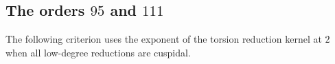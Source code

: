 \subsection{The orders $95$ and $111$}
The following criterion uses the exponent of the torsion reduction
kernel at $2$ when all low-degree reductions are cuspidal.



